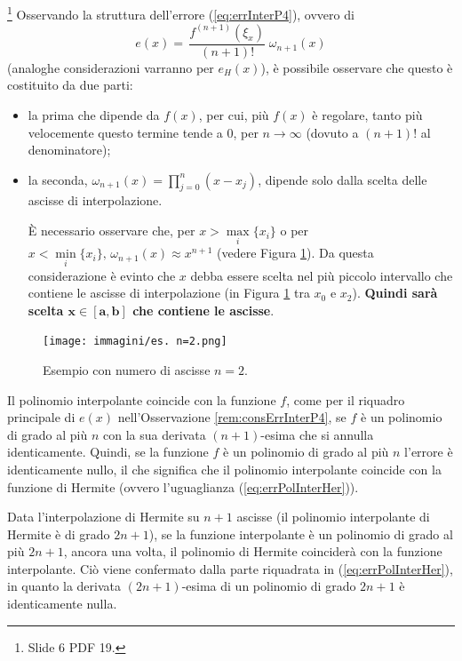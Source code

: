 \begin{remark}\label{rem:consErrInterP4}\footnote{Slide 6 PDF 19.}
    Osservando la struttura dell'errore (\ref{eq:errInterP4}), ovvero di
    \begin{equation*}
        e(x)=\,\boxed{\boxed{\frac{f^{(n+1)}(\xi_x)}{(n+1)!}}\;\boxed{\omega_{n+1}(x)}}
    \end{equation*}
    (analoghe considerazioni varranno per $e_H(x)$), è possibile osservare che questo è costituito da due parti:
    \begin{itemize}
    	\item la prima che dipende da $\boxed{f(x)}$, per cui, più $f(x)$ è regolare, tanto più velocemente questo termine tende a 0, per $n\rightarrow\infty$ (dovuto a $(n+1)!$ al denominatore);
    	\item la seconda, $\boxed{\omega_{n+1}(x)=\prod_{j=0}^n(x-x_j)}$, dipende solo dalla scelta delle ascisse di interpolazione.
    	
    	È necessario osservare che, per $x>\underset{i}{\max}\{x_i\}$ o per $x<\underset{i}{\min}\{x_i\},\, \omega_{n+1}(x)\approx x^{n+1}$ (vedere Figura \ref{fig:osservazione_errore_interpolazione}). Da questa considerazione è evinto che $x$ debba essere scelta nel più piccolo intervallo che contiene le ascisse di interpolazione (in Figura \ref{fig:osservazione_errore_interpolazione} tra $x_0$ e $x_2$). \textbf{Quindi sarà scelta $\boldsymbol{x\in [a,b]}$ che contiene le ascisse}.
    \end{itemize}
\end{remark}

\begin{figure}
    \centering
    \texttt{[image: immagini/es. n=2.png]}
    \caption{\label{fig:osservazione_errore_interpolazione} Esempio con numero di ascisse $n=2$.}
\end{figure}

Il polinomio interpolante coincide con la funzione $f$, come per il riquadro principale di $e(x)$ nell'Osservazione \ref{rem:consErrInterP4}, se $f$ è un polinomio di grado al più $n$ con la sua derivata $(n+1)$-esima che si annulla identicamente. Quindi, se la funzione $f$ è un polinomio di grado al più $n$ l'errore è identicamente nullo, il che significa che il polinomio interpolante coincide con la funzione di Hermite (ovvero l'uguaglianza (\ref{eq:errPolInterHer})).

Data l'interpolazione di Hermite su $n+1$ ascisse (il polinomio interpolante di Hermite è di grado $2n+1$), se la funzione interpolante è un polinomio di grado al più $2n+1$, ancora una volta, il polinomio di Hermite coinciderà con la funzione interpolante. Ciò viene confermato dalla parte riquadrata in (\ref{eq:errPolInterHer}), in quanto la derivata $(2n+1)$-esima di un polinomio di grado $2n+1$ è identicamente nulla.

